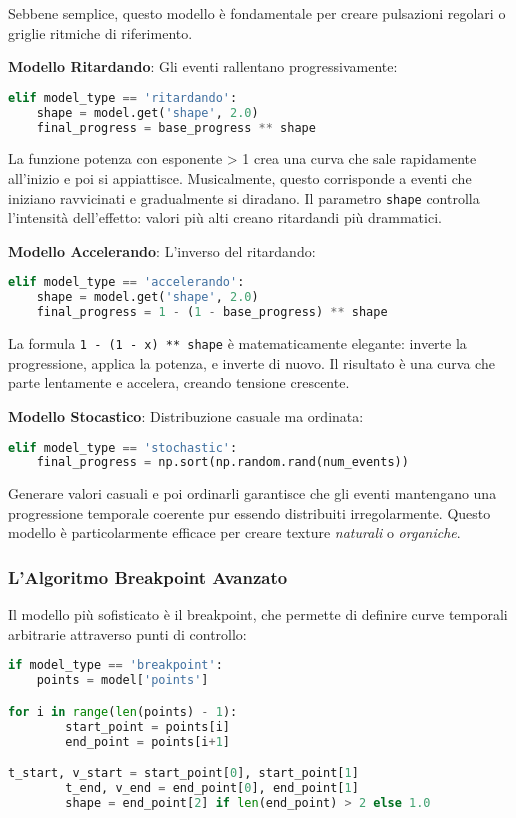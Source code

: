 Sebbene semplice, questo modello è fondamentale per creare pulsazioni regolari o griglie ritmiche di riferimento.

\textbf{Modello Ritardando}: Gli eventi rallentano progressivamente:
\begin{lstlisting}[language=Python]
elif model_type == 'ritardando':
    shape = model.get('shape', 2.0)
    final_progress = base_progress ** shape
\end{lstlisting}

La funzione potenza con esponente > 1 crea una curva che sale rapidamente all'inizio e poi si appiattisce. Musicalmente, questo corrisponde a eventi che iniziano ravvicinati e gradualmente si diradano. Il parametro \texttt{shape} controlla l'intensità dell'effetto: valori più alti creano ritardandi più drammatici.

\textbf{Modello Accelerando}: L'inverso del ritardando:
\begin{lstlisting}[language=Python]
elif model_type == 'accelerando':
    shape = model.get('shape', 2.0)
    final_progress = 1 - (1 - base_progress) ** shape
\end{lstlisting}

La formula \texttt{1 {-} (1 {-} x) ** shape} è matematicamente elegante: inverte la progressione, applica la potenza, e inverte di nuovo. Il risultato è una curva che parte lentamente e accelera, creando tensione crescente.

\textbf{Modello Stocastico}: Distribuzione casuale ma ordinata:
\begin{lstlisting}[language=Python]
elif model_type == 'stochastic':
    final_progress = np.sort(np.random.rand(num_events))
\end{lstlisting}

Generare valori casuali e poi ordinarli garantisce che gli eventi mantengano una progressione temporale coerente pur essendo distribuiti irregolarmente. Questo modello è particolarmente efficace per creare texture \textit{naturali} o \textit{organiche}.
\subsubsection{L'Algoritmo Breakpoint Avanzato}
Il modello più sofisticato è il breakpoint, che permette di definire curve temporali arbitrarie attraverso punti di controllo:

\begin{lstlisting}[language=Python]
if model_type == 'breakpoint':
    points = model['points']

for i in range(len(points) - 1):
        start_point = points[i]
        end_point = points[i+1]

t_start, v_start = start_point[0], start_point[1]
        t_end, v_end = end_point[0], end_point[1]
        shape = end_point[2] if len(end_point) > 2 else 1.0
\end{lstlisting}

